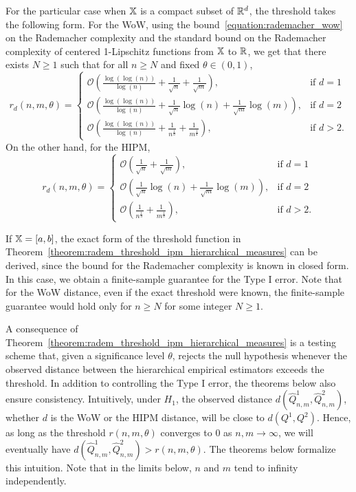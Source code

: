 For the particular case when $\mathbb{X}$ is a compact subset of $\mathbb{R}^d$, the threshold takes the following form. For the WoW, using the bound~\eqref{equation:rademacher_wow} on the Rademacher complexity and the standard bound on the Rademacher complexity of centered 1-Lipschitz functions from $\mathbb{X}$ to $\mathbb{R}$, we get that there exists $N \geq 1$ such that for all $n \geq N$ and fixed $\theta \in (0,1)$,
\begin{equation}\label{equation:wow_threshold}
r_d(n, m, \theta) = 
\begin{cases}
    \mathcal{O} \left(\frac{\log(\log(n))}{\log(n)} + \frac{1}{\sqrt{n}} + \frac{1}{\sqrt{m}}\right), & \text{if } d = 1 \\
    \mathcal{O} \left(\frac{\log(\log(n))}{\log(n)} + \frac{1}{\sqrt{n}}\log(n) + \frac{1}{\sqrt{m}}\log(m)\right), & \text{if } d = 2 \\
    \mathcal{O} \left(\frac{\log(\log(n))}{\log(n)} + \frac{1}{n^{\frac{1}{d}}} + \frac{1}{m^{\frac{1}{d}}}\right), & \text{if } d > 2.
\end{cases}
\end{equation}
On the other hand, for the HIPM,
\begin{equation}\label{equation:hipm_threshold}
r_d(n, m, \theta) = 
\begin{cases}
    \mathcal{O} \left( \frac{1}{\sqrt{n}} + \frac{1}{\sqrt{m}}\right), & \text{if } d = 1 \\
    \mathcal{O} \left( \frac{1}{\sqrt{n}}\log(n) + \frac{1}{\sqrt{m}}\log(m)\right), & \text{if } d = 2 \\
    \mathcal{O} \left( \frac{1}{n^{\frac{1}{d}}} + \frac{1}{m^{\frac{1}{d}}}\right), & \text{if } d > 2.
\end{cases}
\end{equation}

\begin{remark}
If $\mathbb{X} = [a,b]$, the exact form of the threshold function in Theorem~\ref{theorem:radem_threshold_ipm_hierarchical_measures} can be derived, since the bound for the Rademacher complexity is known in closed form. In this case, we obtain a finite-sample guarantee for the Type I error. Note that for the WoW distance, even if the exact threshold were known, the finite-sample guarantee would hold only for $n \geq N$ for some integer $N \geq 1$.
\end{remark}

A consequence of Theorem~\ref{theorem:radem_threshold_ipm_hierarchical_measures} is a testing scheme that, given a significance level $\theta$, rejects the null hypothesis whenever the observed distance between the hierarchical empirical estimators exceeds the threshold. In addition to controlling the Type I error, the theorems below also ensure consistency. Intuitively, under $H_1$, the observed distance $d(\widehat{Q}^1_{n,m}, \widehat{Q}^2_{n,m})$, whether $d$ is the WoW or the HIPM distance, will be close to $d(Q^1, Q^2)$. Hence, as long as the threshold $r(n, m, \theta)$ converges to $0$ as $n, m \to \infty$, we will eventually have $d(\widehat{Q}^1_{n,m}, \widehat{Q}^2_{n,m}) > r(n, m, \theta)$. The theorems below formalize this intuition. Note that in the limits below, $n$ and $m$ tend to infinity independently.

